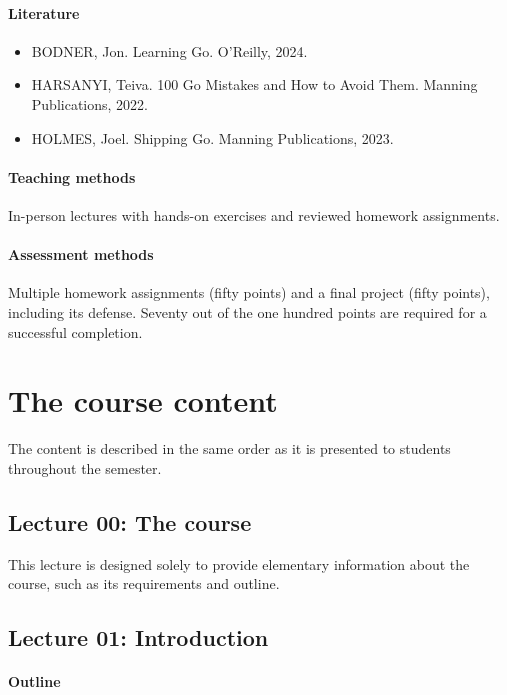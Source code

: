 \documentclass[
  digital,
  color,
  oneside,
  nosansbold,
  nocolorbold,
  lof,
  lot,
]{fithesis4}
\begin{document}
\subsubsection{Literature}

\begin{itemize}
    \item BODNER, Jon. Learning Go. O’Reilly, 2024.\cite{learning-go}
    \item HARSANYI, Teiva. 100 Go Mistakes and How to Avoid Them. Manning Publications, 2022.\cite{100-go-mistakes}
    \item HOLMES, Joel. Shipping Go. Manning Publications, 2023.\cite{shipping-go}
\end{itemize}

\subsubsection{Teaching methods}

In-person lectures with hands-on exercises and reviewed homework assignments.

\subsubsection{Assessment methods}

Multiple homework assignments (fifty points) and a final project (fifty points), including its defense. Seventy out of the one hundred points are required for a successful completion.

\chapter{The course content}

The content is described in the same order as it is presented to students throughout the semester.

\section{Lecture 00: The course}

This lecture is designed solely to provide elementary information about the course, such as its requirements and outline.

\section{Lecture 01: Introduction}

\subsubsection{Outline}
\end{document}
